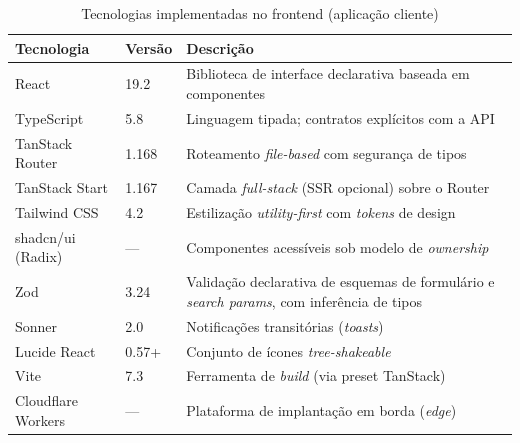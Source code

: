\begin{table}[H]
\centering
\caption{Tecnologias implementadas no frontend (aplicação cliente)}
\label{tab:tecnologias_frontend}
\begin{tabularx}{\textwidth}{l l X}
\toprule
\textbf{Tecnologia} & \textbf{Versão} & \textbf{Descrição} \\
\midrule
React & 19.2 & Biblioteca de interface declarativa baseada em componentes \\
TypeScript & 5.8 & Linguagem tipada; contratos explícitos com a API \\
TanStack Router & 1.168 & Roteamento \textit{file-based} com segurança de tipos \\
TanStack Start & 1.167 & Camada \textit{full-stack} (SSR opcional) sobre o Router \\
Tailwind CSS & 4.2 & Estilização \textit{utility-first} com \textit{tokens} de design \\
shadcn/ui (Radix) & --- & Componentes acessíveis sob modelo de \textit{ownership} \\
Zod & 3.24 & Validação declarativa de esquemas de formulário e \textit{search params}, com inferência de tipos \\
Sonner & 2.0 & Notificações transitórias (\textit{toasts}) \\
Lucide React & 0.57+ & Conjunto de ícones \textit{tree-shakeable} \\
Vite & 7.3 & Ferramenta de \textit{build} (via preset TanStack) \\
Cloudflare Workers & --- & Plataforma de implantação em borda (\textit{edge}) \\
\bottomrule
\end{tabularx}
\end{table}
